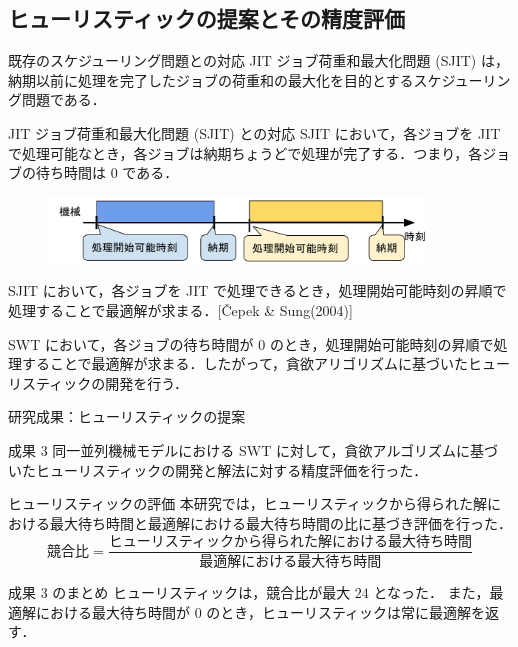 \documentclass[dvipdfmx]{beamer}
\begin{document}
    \subsection{ヒューリスティックの提案とその精度評価}
    \begin{frame}{既存のスケジューリング問題との対応}
      JIT ジョブ荷重和最大化問題 (SJIT) は，納期以前に処理を完了したジョブの荷重和の最大化を目的とするスケジューリング問題である．
      \begin{block}{JIT ジョブ荷重和最大化問題 (SJIT) との対応}
        SJIT において，各ジョブを JIT で処理可能なとき，各ジョブは納期ちょうどで処理が完了する．つまり，各ジョブの待ち時間は $0$ である．
        \vspace{-2mm}
        \begin{figure}[h]
          \centering
          \includegraphics[width=10cm]{figure/SJIT1.pdf}
        \end{figure}
        \vspace{-2mm}
        SJIT において，各ジョブを JIT で処理できるとき，処理開始可能時刻の昇順で処理することで最適解が求まる．[\v{C}epek \& Sung(2004)]
      \end{block}
      \begin{block}{}
        SWT において，各ジョブの待ち時間が $0$ のとき，処理開始可能時刻の昇順で処理することで最適解が求まる．したがって，貪欲アリゴリズムに基づいたヒューリスティックの開発を行う．
      \end{block}
    \end{frame}

    \begin{frame}{研究成果：ヒューリスティックの提案}
      \begin{alertblock}{成果 3}
        同一並列機械モデルにおける SWT に対して，貪欲アルゴリズムに基づいたヒューリスティックの開発と解法に対する精度評価を行った．
      \end{alertblock}
      \begin{block}{ヒューリスティックの評価}
        本研究では，ヒューリスティックから得られた解における最大待ち時間と最適解における最大待ち時間の比に基づき評価を行った．
        $${\displaystyle \text{競合比} = \frac{\text{ヒューリスティックから得られた解における最大待ち時間}}{\text{最適解における最大待ち時間}}}$$
      \end{block}
      \begin{alertblock}{成果 3 のまとめ}
        ヒューリスティックは，競合比が最大 $24$ となった．
        また，最適解における最大待ち時間が $0$ のとき，ヒューリスティックは常に最適解を返す．
      \end{alertblock}
    \end{frame}
\end{document}
